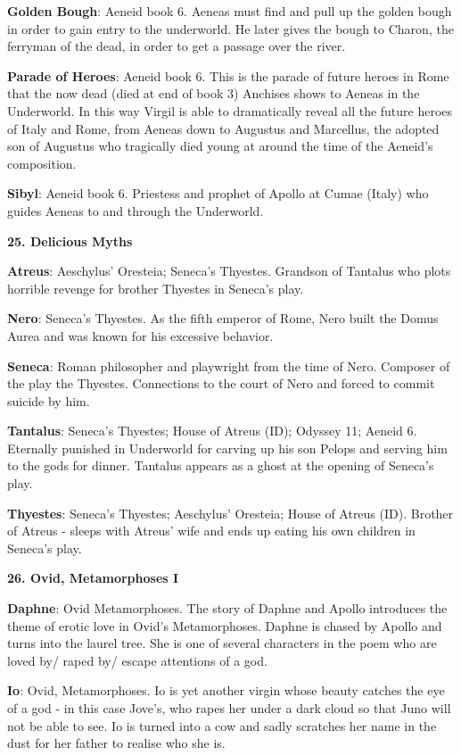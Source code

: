 \documentclass{scrartcl}
\begin{document}
\begin{multicols*}{3}
{\bf Golden Bough}: Aeneid book 6. Aeneas must find and pull up the golden bough in order to gain entry to the underworld. He later gives the bough to Charon, the ferryman of the dead, in order to get a passage over the river.

{\bf Parade of Heroes}: Aeneid book 6. This is the parade of future heroes in Rome that the now dead (died at end of book 3) Anchises shows to Aeneas in the Underworld. In this way Virgil is able to dramatically reveal all the future heroes of Italy and Rome, from Aeneas down to Augustus and Marcellus, the adopted son of Augustus who tragically died young at around the time of the Aeneid's composition.

{\bf Sibyl}: Aeneid book 6. Priestess and prophet of Apollo at Cumae (Italy) who guides Aeneas to and through the Underworld.


{\bf 25. Delicious Myths}

{\bf Atreus}: Aeschylus' Oresteia; Seneca's Thyestes. Grandson of Tantalus who plots horrible revenge for brother Thyestes in Seneca's play.

{\bf Nero}: Seneca's Thyestes. As the fifth emperor of Rome, Nero built the Domus Aurea and was known for his excessive behavior.

{\bf Seneca}: Roman philosopher and playwright from the time of Nero. Composer of the play the Thyestes. Connections to the court of Nero and forced to commit suicide by him.

{\bf Tantalus}: Seneca's Thyestes; House of Atreus (ID); Odyssey 11; Aeneid 6. Eternally punished in Underworld for carving up his son Pelops and serving him to the gods for dinner. Tantalus appears as a ghost at the opening of Seneca's play.

{\bf Thyestes}: Seneca's Thyestes; Aeschylus' Oresteia; House of Atreus (ID). Brother of Atreus - sleeps with Atreus' wife and ends up eating his own children in Seneca's play.


{\bf 26. Ovid, Metamorphoses I}

{\bf Daphne}: Ovid Metamorphoses. The story of Daphne and Apollo introduces the theme of erotic love in Ovid's Metamorphoses. Daphne is chased by Apollo and turns into the laurel tree. She is one of several characters in the poem who are loved by/ raped by/ escape attentions of a god.

{\bf Io}: Ovid, Metamorphoses. Io is yet another virgin whose beauty catches the eye of a god - in this case Jove's, who rapes her under a dark cloud so that Juno will not be able to see. Io is turned into a cow and sadly scratches her name in the dust for her father to realise who she is.


\end{multicols*}
\end{document}
